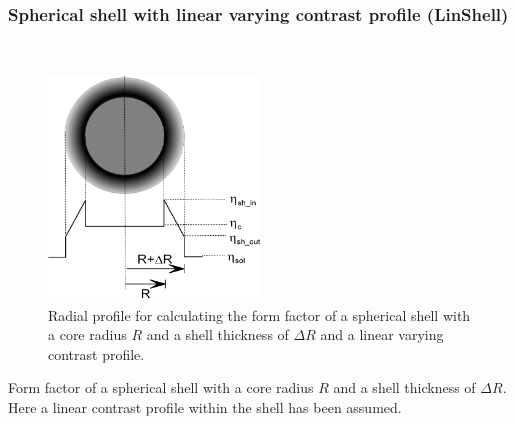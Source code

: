 
\clearpage
\subsubsection{Spherical shell with linear varying contrast profile (LinShell)}
\label{sect:LinShell} ~\\

\begin{figure}[htb]
\begin{center}
\includegraphics[width=0.5\textwidth,height=0.533\textwidth]{../images/form_factor/spheres/linshell.png}
\end{center}
\caption{Radial profile for calculating the form factor of a spherical shell with a core radius $R$
and a shell thickness of $\Delta R$ and a linear varying contrast
profile.} \label{LinShell1Profile}
\end{figure}

Form factor of a spherical shell with a core radius $R$ and a
shell thickness of $\Delta R$. Here a linear contrast profile
within the shell has been assumed.

